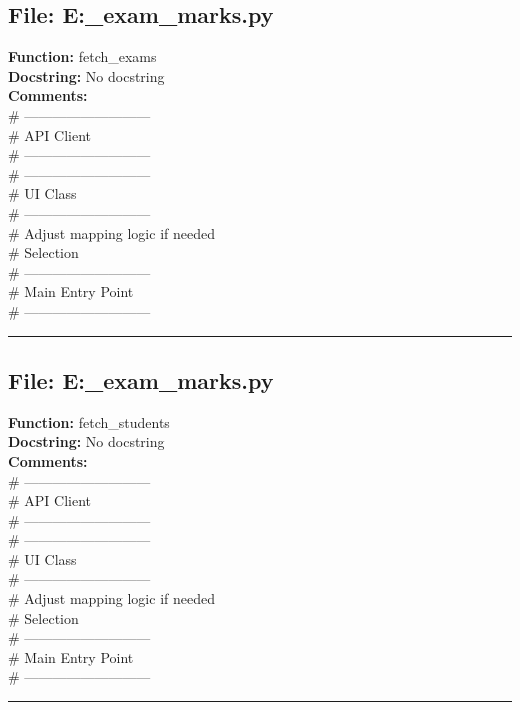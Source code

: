 {\subsection*{File: E:\project\capstone\frontend\faculty\mst_exam_marks.py}
\textbf{Function:} fetch_exams\\
\textbf{Docstring:} No docstring\\
\textbf{Comments:}\\
# ---------------------------\\
# API Client\\
# ---------------------------\\
# ---------------------------\\
# UI Class\\
# ---------------------------\\
# Adjust mapping logic if needed\\
# Selection\\
# ---------------------------\\
# Main Entry Point\\
# ---------------------------\\

\hrule

\subsection*{File: E:\project\capstone\frontend\faculty\mst_exam_marks.py}
\textbf{Function:} fetch_students\\
\textbf{Docstring:} No docstring\\
\textbf{Comments:}\\
# ---------------------------\\
# API Client\\
# ---------------------------\\
# ---------------------------\\
# UI Class\\
# ---------------------------\\
# Adjust mapping logic if needed\\
# Selection\\
# ---------------------------\\
# Main Entry Point\\
# ---------------------------\\

\hrule

}
